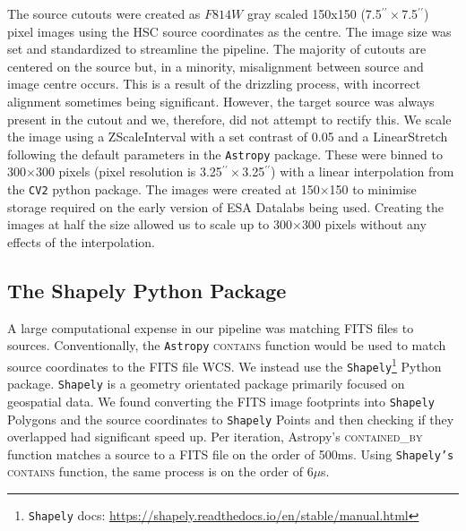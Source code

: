 The source cutouts were created as $F814W$ gray scaled 150x150 (7.5$^{\prime \prime}\times$7.5$^{\prime \prime}$) pixel images using the HSC source coordinates as the centre. The image size was set and standardized to streamline the pipeline. The majority of cutouts are centered on the source but, in a minority, misalignment between source and image centre occurs. This is a result of the drizzling process, with incorrect alignment sometimes being significant. However, the target source was always present in the cutout and we, therefore, did not attempt to rectify this. We scale the image using a ZScaleInterval with a set contrast of 0.05 and a LinearStretch following the default parameters in the \texttt{Astropy} \citep{astropy:2013, astropy:2018} package. These were binned to 300$\times$300 pixels (pixel resolution is 3.25$^{\prime \prime}\times$3.25$^{\prime \prime}$) with a linear interpolation from the \texttt{CV2} python package. The images were created at 150$\times$150 to minimise storage required on the early version of ESA Datalabs being used. Creating the images at half the size allowed us to scale up to 300$\times$300 pixels without any effects of the interpolation.

\subsection{The Shapely Python Package}\label{benchmarks}
\noindent A large computational expense in our pipeline was matching FITS files to sources. Conventionally, the \texttt{Astropy} \textsc{contains} function would be used to match source coordinates to the FITS file WCS. We instead use the \texttt{Shapely}\footnote{\texttt{Shapely} docs: \url{https://shapely.readthedocs.io/en/stable/manual.html}} Python package.  \texttt{Shapely} is a geometry orientated package primarily focused on geospatial data. We found converting the FITS image footprints into \texttt{Shapely} Polygons and the source coordinates to \texttt{Shapely} Points and then checking if they overlapped had significant speed up. Per iteration, Astropy's \textsc{contained\_by} function matches a source to a FITS file on the order of 500ms. Using \texttt{Shapely's} \textsc{contains} function, the same process is on the order of 6$\mu$s.



